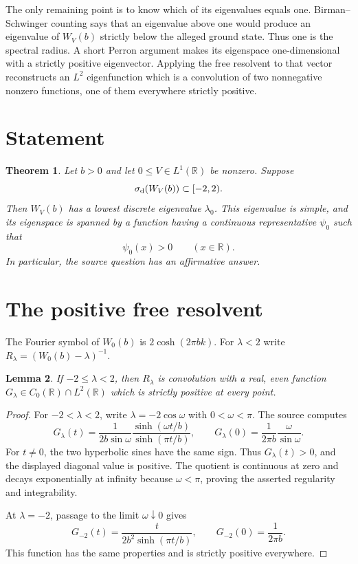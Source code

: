 \documentclass[11pt]{article}
\newtheorem{theorem}{Theorem}
\newtheorem{lemma}[theorem]{Lemma}
\newcommand{\R}{\mathbb R}
\newcommand{\sd}{\sigma_{\rm d}}
\begin{document}
The only remaining point is to know which of its eigenvalues equals one.
Birman--Schwinger counting says that an eigenvalue above one would produce an
eigenvalue of $W_V(b)$ strictly below the alleged ground state.  Thus one is
the spectral radius.  A short Perron argument makes its eigenspace
one-dimensional with a strictly positive eigenvector.  Applying the free
resolvent to that vector reconstructs an $L^2$ eigenfunction which is a
convolution of two nonnegative nonzero functions, one of them everywhere
strictly positive.

\section{Statement}

\begin{theorem}\label{thm:main}
Let $b>0$ and let $0\le V\in L^1(\R)$ be nonzero.  Suppose
\[
 \sd(W_V(b))\subset[-2,2).
\]
Then $W_V(b)$ has a lowest discrete eigenvalue $\lambda_0$.  This eigenvalue
is simple, and its eigenspace is spanned by a function having a continuous
representative $\psi_0$ such that
\[
 \psi_0(x)>0\qquad(x\in\R).
\]
In particular, the source question has an affirmative answer.
\end{theorem}

\section{The positive free resolvent}

The Fourier symbol of $W_0(b)$ is $2\cosh(2\pi bk)$.  For $\lambda<2$ write
$R_\lambda=(W_0(b)-\lambda)^{-1}$.

\begin{lemma}\label{lem:green}
If $-2\le\lambda<2$, then $R_\lambda$ is convolution with a real, even
function $G_\lambda\in C_0(\R)\cap L^2(\R)$ which is strictly positive at
every point.
\end{lemma}

\begin{proof}
For $-2<\lambda<2$, write $\lambda=-2\cos\omega$ with $0<\omega<\pi$.
The source computes
\begin{equation}\label{eq:G}
 G_\lambda(t)=\frac{1}{2b\sin\omega}
 \frac{\sinh(\omega t/b)}{\sinh(\pi t/b)},
 \qquad
 G_\lambda(0)=\frac{1}{2\pi b}\frac{\omega}{\sin\omega}.
\end{equation}
For $t\ne0$, the two hyperbolic sines have the same sign.  Thus
$G_\lambda(t)>0$, and the displayed diagonal value is positive.  The quotient
is continuous at zero and decays exponentially at infinity because
$\omega<\pi$, proving the asserted regularity and integrability.

At $\lambda=-2$, passage to the limit $\omega\downarrow0$ gives
\begin{equation}\label{eq:Gendpoint}
 G_{-2}(t)=\frac{t}{2b^2\sinh(\pi t/b)},
 \qquad G_{-2}(0)=\frac{1}{2\pi b}.
\end{equation}
This function has the same properties and is strictly positive everywhere.
\end{proof}
\end{document}
